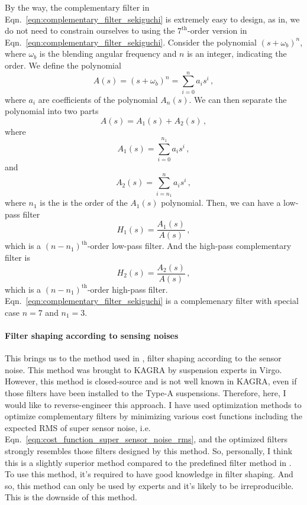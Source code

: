 By the way, the complementary filter in Eqn.~\eqref{eqn:complementary_filter_sekiguchi} is extremely easy to design, as in, we do not need to constrain ourselves to using the $7^\mathrm{th}$-order version in Eqn.~\eqref{eqn:complementary_filter_sekiguchi}.
Consider the polynomial $(s+\omega_b)^n$, where $\omega_b$ is the blending angular frequency and $n$ is an integer, indicating the order.
We define the polynomial
\begin{equation}
	A(s) = (s+\omega_b)^n = \sum_{i=0}^n a_is^i\,,
\end{equation}
where $a_i$ are coefficients of the polynomial $A_n(s)$.
We can then separate the polynomial into two parts
\begin{equation}
	A(s) = A_1(s) + A_2(s)\,,
\end{equation}
where
\begin{equation}
	A_1(s) = \sum_{i=0}^{n_1} a_is^i\,,
\end{equation}
and
\begin{equation}
	A_2(s) = \sum_{i=n_1}^n a_is^i\,,
\end{equation}
where $n_1$ is the is the order of the $A_1(s)$ polynomial.
Then, we can have a low-pass filter
\begin{equation}
	H_1(s) = \frac{A_1(s)}{A(s)}\,,
\end{equation}
which is a $(n-n_1)^\mathrm{th}$-order low-pass filter.
And the high-pass complementary filter is
\begin{equation}
	H_2(s) = \frac{A_2(s)}{A(s)}\,,
\end{equation}
which is a $(n-n_1)^\mathrm{th}$-order high-pass filter.
Eqn.~\eqref{eqn:complementary_filter_sekiguchi} is a complemenary filter with special case $n=7$ and $n_1=3$.

\paragraph{Filter shaping according to sensing noises}
This brings us to the method used in \cite{low_frequency_optimization_and_performance_of_advanced_virgo_seismic_isolation_system}, filter shaping according to the sensor noise.
This method was brought to KAGRA by suspension experts in Virgo.
However, this method is closed-source and is not well known in KAGRA, even if those filters have been installed to the Type-A suspensions.
Therefore, here, I would like to reverse-engineer this approach.
I have used optimization methods to optimize complementary filters by minimizing various cost functions including the expected RMS of super sensor noise, i.e. Eqn.~\eqref{eqn:cost_function_super_sensor_noise_rms}, and the optimized filters strongly resembles those filters designed by this method.
So, personally, I think this is a slightly superior method compared to the predefined filter method in \cite{Sekiguchi:2016bmv, Heijningen:2018evm}.
To use this method, it's required to have good knowledge in filter shaping.
And so, this method can only be used by experts and it's likely to be irreproducible.
This is the downside of this method.

